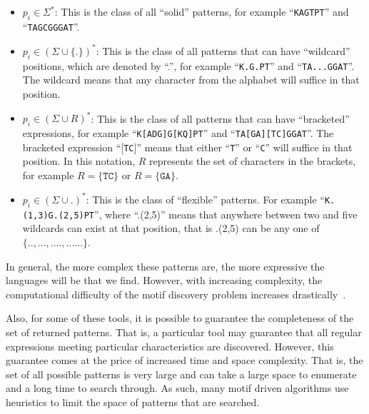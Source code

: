             \begin{itemize}
                \item   $p_i\in\Sigma^{\ast}$:  This is the class
                        of all ``solid'' patterns, for example
                        ``\texttt{KAGTPT}'' and ``\texttt{TAGCGGGAT}''.

                \item   $p_i\in(\Sigma\cup\{.\})^{\ast}$:  This is the
                        class of all patterns that can have ``wildcard''
                        positions, which are denoted by ``.'', for example
                        ``\texttt{K.G.PT}'' and ``\texttt{TA...GGAT}''.
                        The wildcard means that any character from the
                        alphabet will suffice in that position.

                \item   $p_i\in(\Sigma\cup R)^{\ast}$: This
                        is the class of all patterns that can
                        have ``bracketed'' expressions, for
                        example ``\texttt{K[ADG]G[KQ]PT}'' and
                        ``\texttt{TA[GA][TC]GGAT}''.  The bracketed
                        expression ``[\texttt{TC}]'' means that either
                        ``\texttt{T}'' or ``\texttt{C}'' will suffice in
                        that position.  In this notation, $R$ represents
                        the set of characters in the brackets, for example
                        $R=\{\texttt{TC}\}$ or $R=\{\texttt{GA}\}$.

                \item   $p_i\in(\Sigma\cup .)^{\ast}$:  This is the
                        class of ``flexible'' patterns.  For example
                        ``\texttt{K.(1,3)G.(2,5)PT}'', where ``.(2,5)''
                        means that anywhere between two and five wildcards
                        can exist at that position, that is .(2,5)
                        can be any one of $\{..,...,....,......\}$.

            \end{itemize}
            In general, the more complex these patterns are, the more expressive the languages will be that we find.  However,
            with increasing complexity, the computational difficulty of the motif discovery problem increases
            drastically~\cite{maier1978complexity,garey1979computers}.



            Also, for some of these tools, it is possible to
            guarantee the completeness of the set of returned
            patterns.  That is, a particular tool may guarantee that all
            regular expressions meeting particular characteristics are discovered.
            However, this guarantee comes at the price of
            increased time and space complexity.  That is, the set
            of all possible patterns is very large and can take a
            large space to enumerate and a long time to search
            through.  As such, many motif driven algorithms
            use heuristics to limit the space of patterns that are
            searched.


